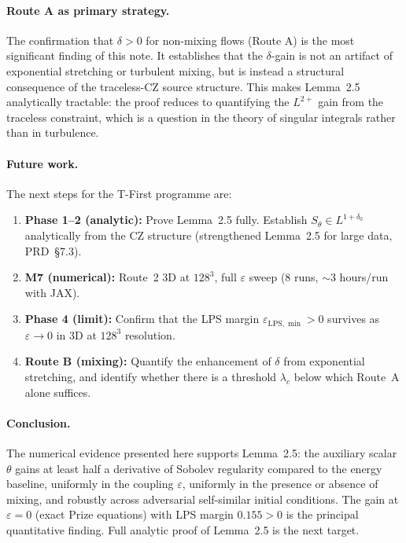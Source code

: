 \documentclass[11pt]{article}
\theoremstyle{definition}
\newcommand{\eps}{\varepsilon}
\newcommand{\LPS}{\mathrm{LPS}}
\newcommand{\thetafield}{\theta}
\begin{document}
\paragraph{Route A as primary strategy.}
The confirmation that $\delta > 0$ for non-mixing flows (Route A) is the most
significant finding of this note. It establishes that the $\delta$-gain is not
an artifact of exponential stretching or turbulent mixing, but is instead a
structural consequence of the traceless-CZ source structure. This makes Lemma~2.5
analytically tractable: the proof reduces to quantifying the $L^{2+}$ gain from
the traceless constraint, which is a question in the theory of singular integrals
rather than in turbulence.

\paragraph{Future work.}
The next steps for the T-First programme are:
\begin{enumerate}[noitemsep]
  \item \textbf{Phase 1--2 (analytic):} Prove Lemma~2.5 fully. Establish
    $S_\theta \in L^{1+\delta_0}$ analytically from the CZ structure
    (strengthened Lemma~2.5 for large data, PRD~\S7.3).
  \item \textbf{M7 (numerical):} Route~2 3D at $128^3$, full $\eps$ sweep
    (8 runs, $\sim 3$ hours/run with JAX).
  \item \textbf{Phase 4 (limit):} Confirm that the LPS margin $\eps_{\LPS,\min} > 0$
    survives as $\eps \to 0$ in 3D at $128^3$ resolution.
  \item \textbf{Route B (mixing):} Quantify the enhancement of $\delta$ from
    exponential stretching, and identify whether there is a threshold $\lambda_c$
    below which Route~A alone suffices.
\end{enumerate}

\paragraph{Conclusion.}
The numerical evidence presented here supports Lemma~2.5: the auxiliary scalar
$\thetafield$ gains at least half a derivative of Sobolev regularity compared
to the energy baseline, uniformly in the coupling $\eps$, uniformly in the
presence or absence of mixing, and robustly across adversarial self-similar
initial conditions. The gain at $\eps = 0$ (exact Prize equations) with LPS
margin $0.155 > 0$ is the principal quantitative finding. Full analytic proof
of Lemma~2.5 is the next target.
\end{document}
